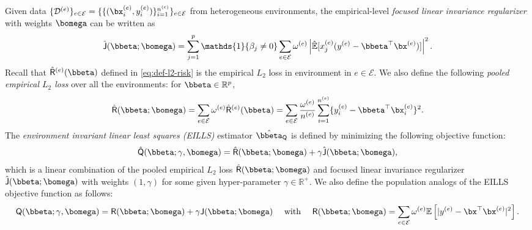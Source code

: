 \documentclass[10pt]{article}
\numberwithin{equation}{section}
\begin{document}
{Given data $\{\mathcal{D}^{(e)}\}_{e\in \mathcal{E}} = \{\{(\bx_i^{(e)},y_i^{(e)})\}_{i=1}^{n^{(e)}}\}_{e\in \mathcal{E}}$ from heterogeneous environments, the empirical-level \emph{focused linear invariance regularizer} with weights $\bomega$ can be written as
\begin{align}
\label{eq:invariant-regularizer-empirical}
    \hat{\mathsf{J}}(\bbeta;\bomega) = \sum_{j=1}^p \mathds{1}\{\beta_j \neq 0\} \sum_{e\in \mathcal{E}} \omega^{(e)} \left| \hat{\mathbb{E}}[x_j^{(e)} (y^{(e)} - \bbeta^\top \bx^{(e)})]\right|^2.
\end{align} 
Recall that $\hat{\mathsf{R}}^{(e)}(\bbeta)$ defined in \eqref{eq:def-l2-risk} is the empirical $L_2$ loss in environment in $e\in \mathcal{E}$. We also define the following \emph{pooled empirical $L_2$ loss} over all the environments: for $\bbeta \in \mathbb{R}^p$,
\begin{align}
\label{eq:pooled-l2-risk-empirical}
    \hat{\mathsf{R}}(\bbeta;\bomega) = \sum_{e\in \mathcal{E}} \omega^{(e)} \hat{\mathsf{R}}^{(e)}(\bbeta) = \sum_{e\in \mathcal{E}}  \frac{\omega^{(e)}}{n^{(e)}} \sum_{i=1}^{n^{(e)}} \{ y^{(e)}_i - \bbeta^\top \bx^{(e)}_i \}^2.
\end{align}
The \emph{environment invariant linear least squares (EILLS)} estimator $\hat{\bbeta}_{\mathsf{Q}}$ is defined by minimizing the following objective function:
\begin{align}
\label{eq:eills-objective-q}
    \hat{\mathsf{Q}}(\bbeta; \gamma, \bomega) = \hat{\mathsf{R}}(\bbeta;\bomega) + \gamma \hat{\mathsf{J}}(\bbeta;\bomega),
\end{align} which is a linear combination of the pooled empirical $L_2$ loss $\hat{\mathsf{R}}(\bbeta;\bomega)$ and focused linear invariance regularizer $\hat{\mathsf{J}}(\bbeta;\bomega)$ with weights $(1,\gamma)$ for some given hyper-parameter $\gamma \in \mathbb{R}^+$. We also define the population analogs of the EILLS objective function as follows:
\begin{align}
\label{eq:eills-objective-q-population}
    \mathsf{Q}(\bbeta;\gamma,\bomega) = \mathsf{R}(\bbeta; \bomega) + \gamma \mathsf{J}(\bbeta; \bomega) ~~~~ \text{with} ~~~~ \mathsf{R}(\bbeta; \bomega) = \sum_{e\in \mathcal{E}} \omega^{(e)} \mathbb{E} \left[|y^{(e)} - \bx^\top \bx^{(e)}|^2 \right].
\end{align}

}
\end{document}
